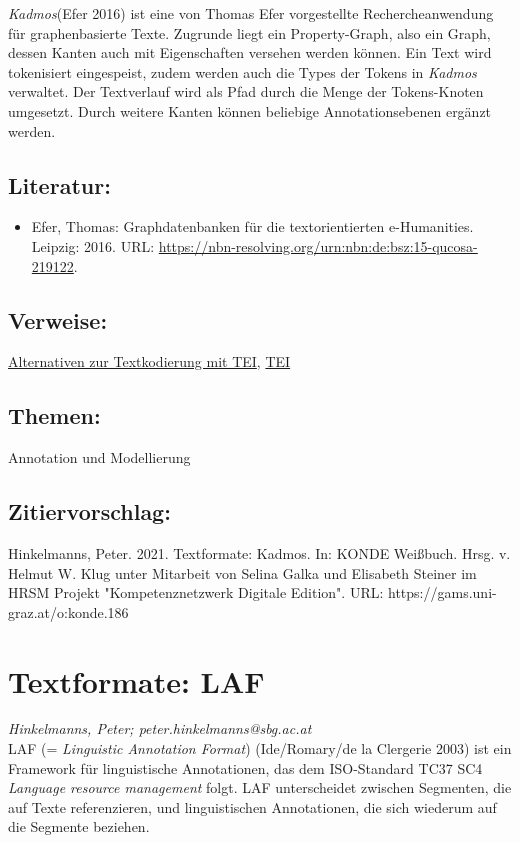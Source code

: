 \documentclass{article}
\begin{document}
    \emph{Kadmos}(Efer 2016) ist eine von Thomas Efer vorgestellte Rechercheanwendung für graphenbasierte Texte. Zugrunde liegt ein Property-Graph, also ein Graph, dessen Kanten auch mit Eigenschaften versehen werden können. Ein Text wird tokenisiert eingespeist, zudem werden auch die Types der Tokens in \emph{Kadmos} verwaltet. Der Textverlauf wird als Pfad durch die Menge der Tokens-Knoten umgesetzt. Durch weitere Kanten können beliebige Annotationsebenen ergänzt werden.\\
            
        \subsection*{Literatur:}\begin{itemize}\item Efer, Thomas: Graphdatenbanken für die textorientierten e-Humanities. Leipzig: 2016. URL: \url{https://nbn-resolving.org/urn:nbn:de:bsz:15-qucosa-219122}.\end{itemize}\subsection*{Verweise:}\href{https://gams.uni-graz.at/o:konde.15}{Alternativen zur Textkodierung mit TEI}, \href{https://gams.uni-graz.at/o:konde.178}{TEI}\subsection*{Themen:}Annotation und Modellierung\subsection*{Zitiervorschlag:}Hinkelmanns, Peter. 2021. Textformate: Kadmos. In: KONDE Weißbuch. Hrsg. v. Helmut W. Klug unter Mitarbeit von Selina Galka und Elisabeth Steiner im HRSM Projekt "Kompetenznetzwerk Digitale Edition". URL: https://gams.uni-graz.at/o:konde.186\newpage\section*{Textformate: LAF} \emph{Hinkelmanns, Peter; peter.hinkelmanns@sbg.ac.at }\\
        
    LAF (= \emph{Linguistic Annotation Format}) (Ide/Romary/de la Clergerie 2003) ist ein Framework für linguistische Annotationen, das dem ISO-Standard TC37 SC4 \emph{Language resource management} folgt. LAF unterscheidet zwischen Segmenten, die auf Texte referenzieren, und linguistischen Annotationen, die sich wiederum auf die Segmente beziehen.\\
            
\end{document}
